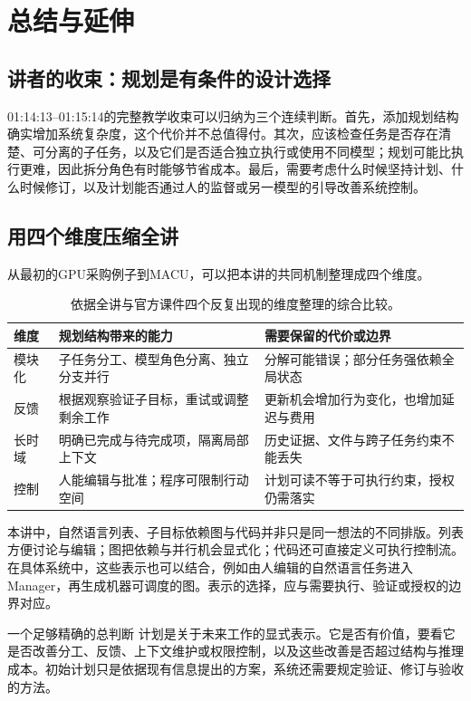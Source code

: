 \documentclass[11pt,a4paper]{article}
\begin{document}
\section{总结与延伸}
\subsection{讲者的收束：规划是有条件的设计选择}
01:14:13--01:15:14的完整教学收束可以归纳为三个连续判断。首先，添加规划结构确实增加系统复杂度，这个代价并不总值得付。其次，应该检查任务是否存在清楚、可分离的子任务，以及它们是否适合独立执行或使用不同模型；规划可能比执行更难，因此拆分角色有时能够节省成本。最后，需要考虑什么时候坚持计划、什么时候修订，以及计划能否通过人的监督或另一模型的引导改善系统控制。

\subsection{用四个维度压缩全讲}
从最初的GPU采购例子到MACU，可以把本讲的共同机制整理成四个维度。
\begin{table}[H]
\centering\small
\begin{tabularx}{\textwidth}{L{2.2cm}XX}
\toprule
维度 & 规划结构带来的能力 & 需要保留的代价或边界 \\
\midrule
模块化 & 子任务分工、模型角色分离、独立分支并行 & 分解可能错误；部分任务强依赖全局状态 \\
反馈 & 根据观察验证子目标，重试或调整剩余工作 & 更新机会增加行为变化，也增加延迟与费用 \\
长时域 & 明确已完成与待完成项，隔离局部上下文 & 历史证据、文件与跨子任务约束不能丢失 \\
控制 & 人能编辑与批准；程序可限制行动空间 & 计划可读不等于可执行约束，授权仍需落实 \\
\bottomrule
\end{tabularx}
\caption{依据全讲与官方课件四个反复出现的维度整理的综合比较。}
\end{table}

本讲中，自然语言列表、子目标依赖图与代码并非只是同一想法的不同排版。列表方便讨论与编辑；图把依赖与并行机会显式化；代码还可直接定义可执行控制流。在具体系统中，这些表示也可以结合，例如由人编辑的自然语言任务进入Manager，再生成机器可调度的图。表示的选择，应与需要执行、验证或授权的边界对应。

\begin{importantbox}{一个足够精确的总判断}
计划是关于未来工作的显式表示。它是否有价值，要看它是否改善分工、反馈、上下文维护或权限控制，以及这些改善是否超过结构与推理成本。初始计划只是依据现有信息提出的方案，系统还需要规定验证、修订与验收的方法。
\end{importantbox}
\end{document}
